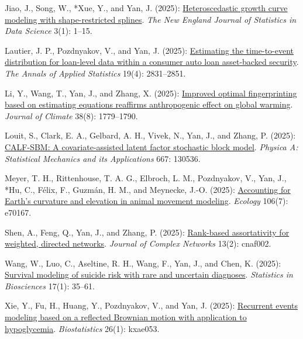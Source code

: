\begin{RefereedJournalArticles}
\item *Jiao, J., Song, W., *Xue, Y., and Yan, J.
(2025): \href{https://doi.org/10.51387/24-NEJSDS69}{Heteroscedastic
growth curve modeling with shape-restricted splines}. \emph{The New
England Journal of Statistics in Data Science} 3(1): 1--15.

\item *Lautier, J. P., Pozdnyakov, V., and Yan, J. (2025):
\href{https://doi.org/10.1214/25-AOAS2103}{Estimating the time-to-event
distribution for loan-level data within a consumer auto loan
asset-backed security}. \emph{The Annals of Applied Statistics} 19(4):
2831--2851.

\item *Li, Y., Wang, T., Yan, J., and Zhang, X. (2025):
\href{https://doi.org/10.1175/JCLI-D-24-0193.1}{Improved optimal
fingerprinting based on estimating equations reaffirms anthropogenic
effect on global warming}. \emph{Journal of Climate} 38(8): 1779--1790.

\item *Louit, S., Clark, E. A., Gelbard, A. H., Vivek, N., Yan,
J., and Zhang, P. (2025):
\href{https://doi.org/10.1016/j.physa.2025.130536}{CALF-SBM: A
covariate-assisted latent factor stochastic block model}. \emph{Physica
A: Statistical Mechanics and its Applications} 667: 130536.

\item Meyer, T. H., Rittenhouse, T. A. G., Elbroch, L. M., Pozdnyakov, V.,
Yan, J., *Hu, C., F\'{e}lix, F., Guzm\'{a}n, H. M., and
Meynecke, J.-O. (2025):
\href{https://doi.org/10.1002/ecy.70167}{Accounting for Earth's
curvature and elevation in animal movement modeling}. \emph{Ecology}
106(7): e70167.

\item Shen, A., Feng, Q., Yan, J., and Zhang, P. (2025):
\href{https://doi.org/10.1093/comnet/cnaf002}{Rank-based assortativity
for weighted, directed networks}. \emph{Journal of Complex Networks}
13(2): cnaf002.

\item *Wang, W., Luo, C., Aseltine, R. H., Wang, F., Yan, J., and
Chen, K. (2025):
\href{https://doi.org/10.1007/s12561-023-09374-w}{Survival modeling of
suicide risk with rare and uncertain diagnoses}. \emph{Statistics in
Biosciences} 17(1): 35--61.

\item *Xie, Y., Fu, H., Huang, Y., Pozdnyakov, V., and Yan, J.
(2025): \href{https://doi.org/10.1093/biostatistics/kxae053}{Recurrent
events modeling based on a reflected Brownian motion with application to
hypoglycemia}. \emph{Biostatistics} 26(1): kxae053.


\end{RefereedJournalArticles}
